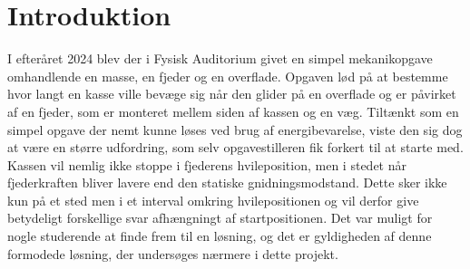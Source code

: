 \chapter{Introduktion}
I efteråret 2024 blev der i Fysisk Auditorium givet en simpel mekanikopgave
omhandlende en masse, en fjeder og en overflade. Opgaven lød  på at bestemme hvor
langt en kasse ville bevæge sig når den glider på en overflade og er påvirket af en fjeder, 
som er monteret mellem siden af kassen og en væg. Tiltænkt som en simpel opgave der nemt kunne løses 
ved brug af energibevarelse, viste den sig dog at være en større udfordring, som selv opgavestilleren fik forkert til at starte med.
Kassen vil nemlig ikke stoppe i fjederens hvileposition, men i stedet når fjederkraften bliver lavere end den statiske gnidningsmodstand. Dette sker ikke kun på et sted men
i et interval omkring hvilepositionen og vil derfor give betydeligt forskellige svar 
afhængningt af startpositionen. Det var muligt for nogle studerende at finde frem til en løsning, 
og det er gyldigheden af denne formodede løsning, 
der undersøges nærmere i dette projekt.
